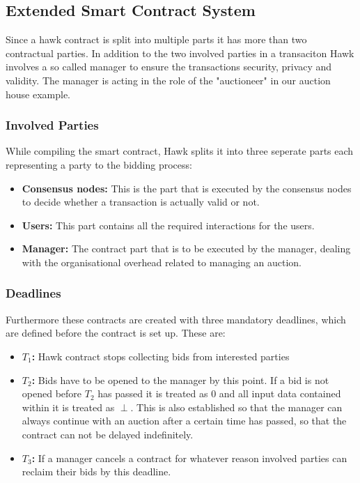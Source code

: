 \subsection{Extended Smart Contract System}
Since a hawk contract is split into multiple parts it has more than two contractual parties. In addition to the two involved parties in a transaciton Hawk involves a so called manager to ensure the transactions security, privacy and validity. The manager is acting in the role of the "auctioneer" in our auction house example. 

\subsubsection{Involved Parties}
While compiling the smart contract, Hawk splits it into three seperate parts each representing a party to the bidding process:\cite[p.840]{Hawk}
\begin{itemize}
\item \textbf{Consensus nodes:}
This is the part that is executed by the consensus nodes to decide whether a transaction is actually valid or not.
\item \textbf{Users:}
This part contains all the required interactions for the users.
\item \textbf{Manager:}
The contract part that is to be executed by the manager, dealing with the organisational overhead related to managing an auction.
\end{itemize}

\subsubsection{Deadlines}
Furthermore these contracts are created with three mandatory deadlines, which are defined before the contract is set up. These are:\cite[p.841]{Hawk}
\begin{itemize}
\item \textbf{$T_1$:} Hawk contract stops collecting bids from interested parties
\item \textbf{$T_2$:} Bids have to be opened to the manager by this point. If a bid is not opened before $T_2$ has passed it is treated as 0 and all input data contained within it is treated as $\perp$. This is also established so that the manager can always continue with an auction after a certain time has passed, so that the contract can not be delayed indefinitely.
\item \textbf{$T_3$:} If a manager cancels a contract for whatever reason involved parties can reclaim their bids by this deadline.
\end{itemize}

